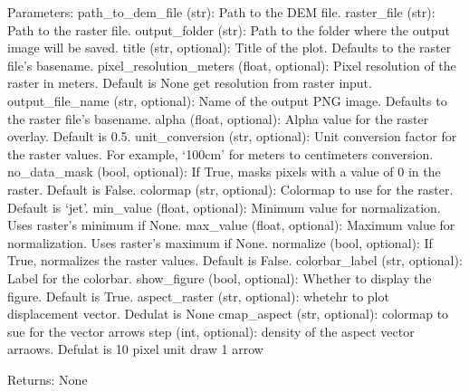 \documentclass[letterpaper,10pt,english]{sphinxmanual}
\begin{document}
\begin{fulllineitems}
\sphinxAtStartPar
Parameters:
path\_to\_dem\_file (str): Path to the DEM file.
raster\_file (str): Path to the raster file.
output\_folder (str): Path to the folder where the output image will be saved.
title (str, optional): Title of the plot. Defaults to the raster file’s basename.
pixel\_resolution\_meters (float, optional): Pixel resolution of the raster in meters. Default is None get resolution from raster input.
output\_file\_name (str, optional): Name of the output PNG image. Defaults to the raster file’s basename.
alpha (float, optional): Alpha value for the raster overlay. Default is 0.5.
unit\_conversion (str, optional): Unit conversion factor for the raster values. For example, ‘100cm’ for meters to centimeters conversion.
no\_data\_mask (bool, optional): If True, masks pixels with a value of 0 in the raster. Default is False.
colormap (str, optional): Colormap to use for the raster. Default is ‘jet’.
min\_value (float, optional): Minimum value for normalization. Uses raster’s minimum if None.
max\_value (float, optional): Maximum value for normalization. Uses raster’s maximum if None.
normalize (bool, optional): If True, normalizes the raster values. Default is False.
colorbar\_label (str, optional): Label for the colorbar. 
show\_figure (bool, optional): Whether to display the figure. Default is True.
aspect\_raster (str, optional): whetehr to plot displacement vector. Dedulat is None 
cmap\_aspect (str, optional): colormap to sue for the vector arrows
step (int, optional): density of the aspect vector arraows. Defulat is 10 pixel unit draw 1 arrow

\sphinxAtStartPar
Returns:
None

\end{fulllineitems}

\end{document}
